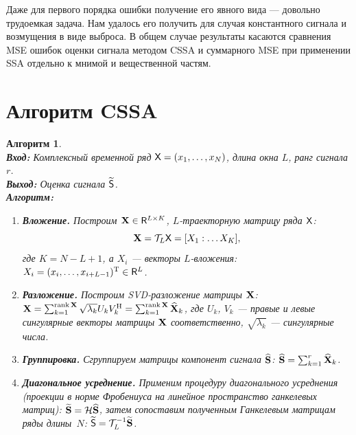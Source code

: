 \documentclass{spisok-article}
\newtheorem{algorithm}{Алгоритм}%
\begin{document}
Даже для первого порядка ошибки получение его явного вида --- довольно трудоемкая задача. Нам удалось его получить для случая константного сигнала и возмущения в виде выброса. В общем случае результаты касаются сравнения MSE ошибок оценки сигнала методом CSSA и суммарного MSE при применении SSA отдельно к мнимой и вещественной частям.



\section{Алгоритм CSSA}
\label{sec:basessa}

\begin{algorithm}
\label{alg:ssa}
~\\
\textbf{Вход:} Комплексный временной ряд $\textsf{X} = (x_1, \dots, x_N)$, \emph{длина окна} $L$,
    ранг сигнала $r$.\\
\textbf{Выход:} Оценка сигнала $\widetilde{\textsf{S}}$.\\
\textbf{Алгоритм:}
\begin{enumerate}
    \item \textbf{Вложение.}
        \label{item:embedding}
        Построим $\mathbf{X} \in \mathsf{R}^{L \times K}$, \emph{$L$-траекторную матрицу} ряда $\textsf{X}$:
        $$\mathbf{X} = \mathcal{T}_L \textsf{X} = [X_1 : \dots X_K],$$
        где $K = N - L + 1$,
        а $X_i$ --- \emph{векторы $L$-вложения:}
        $X_i = (x_i, \dots, x_{i+L-1})^\mathrm{T} \in \mathsf{R}^L$.
    \item \textbf{Разложение.}
        \label{item:decomposition}
        Построим SVD-разложение матрицы $\mathbf{X}$:
        $\mathbf{X} =
        \sum_{k=1}^{\mathop{\mathrm{rank}} \mathbf{X}} \sqrt{\lambda_k} U_k V_k^\mathrm{H} = \sum_{k=1}^{\mathop{\mathrm{rank}} \mathbf{X}} \widehat{\mathbf{X}}_k$,
        где $U_k$, $V_k$ --- правые и левые сингулярные векторы матрицы $\mathbf{X}$ соответственно,
        $\sqrt{\lambda_k}$ --- сингулярные числа.
    \item \textbf{Группировка.} Сгруппируем матрицы компонент сигнала $\widehat{\mathbf{S}}$:
        $\widehat{\mathbf{S}} = \sum_{k=1}^r \widehat{\mathbf{X}}_k$.
    \item \textbf{Диагональное усреднение.}
        \label{item:reconstruction}
        Применим процедуру диагонального усреднения (проекции в норме Фробениуса
        на линейное пространство ганкелевых матриц):
        $\widetilde{\mathbf{S}} = \mathcal{H} \widehat{\mathbf{S}}$,
        затем сопоставим полученным Ганкелевым матрицам ряды длины~$N$:
        $\widetilde{\textsf{S}} = \mathcal{T}_L^{-1} \widetilde{\mathbf{S}}$.
\end{enumerate}
\end{algorithm}
\end{document}
